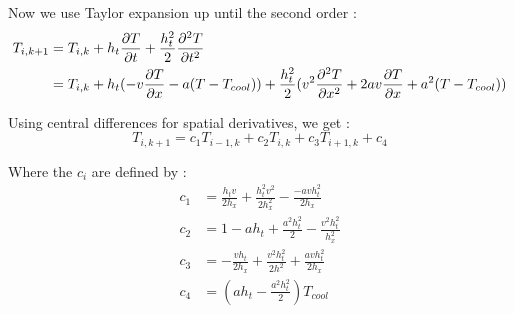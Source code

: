 Now we use Taylor expansion up until the second order : 
\begin{align*}
T_{i,k+1} &= T_{i,k}+h_t \frac{\partial T}{\partial t}+\frac{h_t^2}{2}\frac{\partial^2 T}{\partial t^2}\\
&=T_{i,k}+h_t(-v\frac{\partial T}{\partial x}-a(T-T_{cool}))+\frac{h_t^2}{2}(v^2\frac{\partial^2 T}{\partial x^2}+2av\frac{\partial T}{\partial x}+a^2(T-T_{cool})) 
\end{align*}

Using central differences for spatial derivatives, we get : 
$$T_{i,k+1} = c_1T_{i-1,k}+c_2T_{i,k}+c_3T_{i+1,k}+c_4$$

Where the $c_i$ are defined by : 
\begin{align*}
c_1 &= \frac{h_tv}{2h_x}+\frac{h_t^2v^2}{2h_x^2}-\frac{-avh_t^2}{2h_x}\\
c_2 &=1-ah_t+\frac{a^2h_t^2}{2}-\frac{v^2h_t^2}{h_x^2}\\
c_3 &= -\frac{vh_t}{2h_x}+\frac{v^2h_t^2}{2h^2}+\frac{avh_t^2}{2h_x}\\
c_4 &= (ah_t - \frac{a^2h_t^2}{2})T_{cool}
\end{align*}
